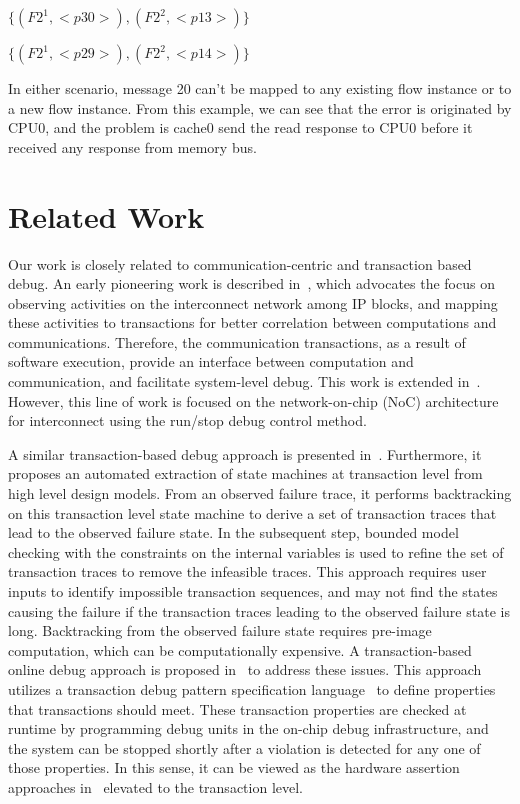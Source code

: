 \documentclass[conference]{IEEEtran}
\begin{document}
$\{(F2^1,<p30>),  (F2^2, <p13>)\}$

$\{(F2^1,<p29>),  (F2^2, <p14>)\}$
\vspace{2 mm}


In either scenario, message 20 can't be mapped to any existing flow instance or to a new flow instance. From this example, we can see that the error is originated by CPU0, and the problem is cache0 send the read response to CPU0 before it received any response from memory bus.%


\section{Related Work}

Our work is closely related to communication-centric and transaction based debug.  An early pioneering work is described in~\cite{Goossens2007NOCS}, which advocates the focus on observing activities on the interconnect network among IP blocks, and mapping these activities to transactions for better correlation between computations and communications.  Therefore, the communication transactions, as a result of software execution, provide an interface between computation and communication, and facilitate  system-level debug.  This work is extended in~\cite{Vermeulen2009VLSI-DAT,Goossens2009DATE}.  However, this line of work is focused on the network-on-chip (NoC) architecture for interconnect using the run/stop debug control method.  

A similar transaction-based debug approach is presented in~\cite{Gharehbaghi2012ISQED}.  Furthermore, it proposes an automated extraction of state machines at transaction level from  high level design models.  From an observed failure trace, it performs backtracking on this transaction level state machine to derive a set of transaction traces that lead to the observed failure state.  In the subsequent step, bounded model checking with the constraints on the internal variables is used to refine the set of transaction traces to remove the infeasible traces.  This approach requires user inputs to identify impossible transaction sequences, and may not find the states causing the failure if the transaction traces leading to the observed failure state is long.  Backtracking from the observed failure state requires pre-image computation, which can be computationally expensive.  A transaction-based online debug approach is proposed in~\cite{Dehbash2014} to address these issues.  This approach utilizes a transaction debug pattern specification language~\cite{Gharehbaghi2009ICCD} to define properties that transactions should meet.  These transaction properties are checked at runtime by programming debug units in the on-chip debug infrastructure, and the system can be stopped shortly after a violation is detected for any one of those properties.  In this sense, it can be viewed as the hardware assertion approaches in~\cite{Boule2007ISQED} elevated to the transaction level. 
\end{document}
